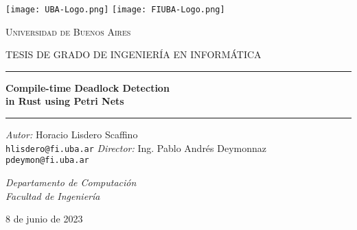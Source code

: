 
\begin{titlepage}
    \centering
    \Large

    \texttt{[image: UBA-Logo.png]}
    \hfill
    \texttt{[image: FIUBA-Logo.png]}

    {\Huge \textsc{Universidad de Buenos Aires} \par}
    {\large \textsc{\uppercase{Tesis de grado de Ingeniería en Informática}}}

    \rule{\linewidth}{0.5mm}
    {\Huge \textbf{Compile-time Deadlock Detection}
        \\ \textbf{in Rust using Petri Nets}}
    \rule{\linewidth}{0.5mm}

    \vfill
    \textit{Autor:} Horacio Lisdero Scaffino\\
    {\large \texttt{hlisdero@fi.uba.ar}}
    \vfill
    \textit{Director:} Ing. Pablo Andrés Deymonnaz\\
    {\large \texttt{pdeymon@fi.uba.ar}}

    \vfill
    \textit{Departamento de Computación}\\
    \textit{Facultad de Ingeniería}
    \vfill

    8 de junio de 2023
\end{titlepage}